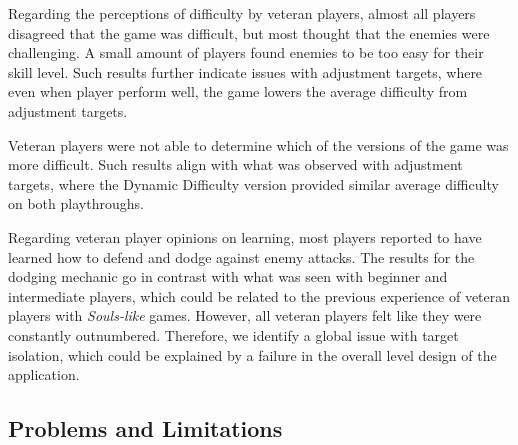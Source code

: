 Regarding the perceptions of difficulty by veteran players, almost all players disagreed that the game was difficult, but most thought that the enemies were challenging. A small amount of players found enemies to be too easy for their skill level. Such results further indicate issues with adjustment targets, where even when player perform well, the game lowers the average difficulty from adjustment targets.

Veteran players were not able to determine which of the versions of the game was more difficult. Such results align with what was observed with adjustment targets, where the Dynamic Difficulty version provided similar average difficulty on both playthroughs.

Regarding veteran player opinions on learning, most players reported to have learned how to defend and dodge against enemy attacks. The results for the dodging mechanic go in contrast with what was seen with beginner and intermediate players, which could be related to the previous experience of veteran players with \emph{Souls-like} games. However, all veteran players felt like they were constantly outnumbered. Therefore, we identify a global issue with target isolation, which could be explained by a failure in the overall level design of the application.


\subsection{Problems and Limitations}

